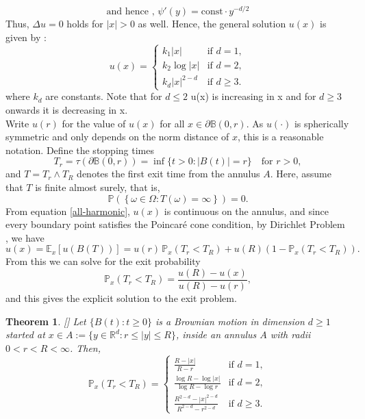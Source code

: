 \documentclass{article}
\numberwithin{equation}{section}
\newtheorem{theorem}{Theorem}[section]
\begin{document}
\[
\text{and hence , } \psi'(y) = \text{const} \cdot y^{-d/2}
\]
\noindent Thus, \( \Delta u = 0 \) holds for \( |x| > 0 \) as well.
Hence, the general solution \( u(x) \) is given by :
\begin{equation}\label{all-harmonic}
u(x) = 
\begin{cases}
k_1|x| & \text{if } d = 1, \\
k_2\log |x| & \text{if } d = 2, \\
k_d|x|^{2 - d} & \text{if } d \geq 3.
\end{cases}
\end{equation}
where \(k_d \) are constants. Note that for \(d \leq 2\) u(x) is increasing in x and for \(d \geq 3\) onwards it is decreasing in x.\\
Write \( u(r) \) for the value of \( u(x) \) for all \( x \in \partial \mathbb{B}(0, r) \). As \( u(\cdot) \) is spherically symmetric and only depends on the norm distance of \( x \), this is a reasonable notation. Define the stopping times
\[
T_r = \tau(\partial \mathbb{B}(0, r)) = \inf \{ t > 0 : |B(t)| = r \} \quad \text{for } r > 0,
\]
and \( T = T_r \wedge T_R \) denotes  the first exit time from the annulus \( A \). Here, assume that \( T \) is finite almost surely, that is,
\[
\mathbb{P}\left( \left\{ \omega \in \Omega : T(\omega) = \infty \right\} \right) = 0.
\]
From equation \eqref{all-harmonic}, \( u(x) \) is continuous on the annulus, and since every boundary point satisfies the Poincaré cone condition, by Dirichlet Problem , we have
\[
u(x) = \mathbb{E}_x \left[ u(B(T)) \right] = u(r) \, \mathbb{P}_x(T_r < T_R) + u(R)\left(1 - \mathbb{P}_x(T_r < T_R)\right).
\]
From this we can solve for the exit probability
\[
\mathbb{P}_x(T_r < T_R) = \frac{u(R) - u(x)}{u(R) - u(r)},
\]
and this gives the explicit solution to the exit problem.
\begin{theorem}\label{exit-annulus}
[{\cite[Theorem 3.18]{PeresMortersBook}}]
Let \( \{B(t) : t \geq 0\} \) is a Brownian motion in dimension \( d \geq 1 \) started at \( x \in A := \{y \in \mathbb{R}^d : r \leq |y| \leq R \} \), inside an annulus \( A \) with radii \( 0 < r < R < \infty \). Then,
\begin{equation}
\mathbb{P}_x(T_r < T_R) =
\begin{cases}
\displaystyle \frac{R - |x|}{R - r} & \text{if } d = 1, \\[10pt]
\displaystyle \frac{\log R - \log |x|}{\log R - \log r} & \text{if } d = 2, \\[10pt]
\displaystyle \frac{R^{2 - d} - |x|^{2 - d}}{R^{2 - d} - r^{2 - d}} & \text{if } d \geq 3.
\end{cases}
\end{equation}

\end{theorem}
\end{document}
